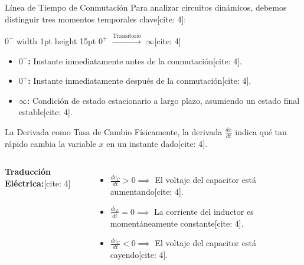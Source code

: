 \documentclass[aspectratio=169, 10pt]{beamer}
\begin{document}
\begin{frame}{Línea de Tiempo de Conmutación}
    Para analizar circuitos dinámicos, debemos distinguir tres momentos temporales clave[cite: 4]:
    
    \vspace{0.5cm}
    \begin{center}
        \Large $0^-$ \quad \vrule width 1pt height 15pt \quad $0^+$ \quad $\xrightarrow{\text{Transitorio}}$ \quad $\infty$[cite: 4]
    \end{center}
    \vspace{0.5cm}
    
    \begin{itemize}
        \item \textbf{$0^-$:} Instante inmediatamente antes de la conmutación[cite: 4].
        \item \textbf{$0^+$:} Instante inmediatamente después de la conmutación[cite: 4].
        \item \textbf{$\infty$:} Condición de estado estacionario a largo plazo, asumiendo un estado final estable[cite: 4].
    \end{itemize}
\end{frame}

\begin{frame}{La Derivada como Tasa de Cambio}
    Físicamente, la derivada $\frac{dx}{dt}$ indica qué tan rápido cambia la variable $x$ en un instante dado[cite: 4].
    
    \begin{columns}
        \textbf{Traducción Eléctrica:}[cite: 4]
        \begin{itemize}
            \item $\frac{dv_C}{dt} > 0 \implies$ El voltaje del capacitor está aumentando[cite: 4].
            \item $\frac{di_L}{dt} = 0 \implies$ La corriente del inductor es momentáneamente constante[cite: 4].
            \item $\frac{dv_C}{dt} < 0 \implies$ El voltaje del capacitor está cayendo[cite: 4].
        \end{itemize}
    \end{columns}
\end{frame}
\end{document}

